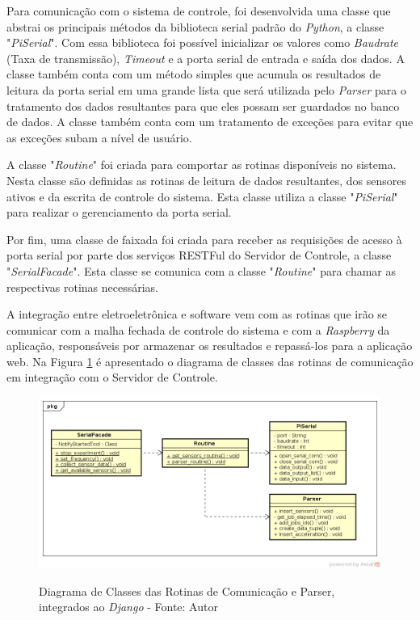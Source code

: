Para comunicação com o sistema de controle, foi desenvolvida uma classe que abstrai os principais métodos da 
biblioteca serial padrão do \textit{Python}, a classe "\textit{PiSerial}".
Com essa biblioteca foi possível inicializar os valores como \textit{Baudrate} (Taxa de transmissão),
\textit{Timeout} e a porta serial de entrada e saída dos dados. A classe também conta com um método simples
que acumula os resultados de leitura da porta serial em uma grande lista que será utilizada pelo \textit{Parser}
para o tratamento dos dados resultantes para que eles possam ser guardados no banco de 
dados. A classe também conta com um tratamento de exceções para evitar que as exceções subam a nível de usuário.

A classe "\textit{Routine}" foi criada para comportar as rotinas disponíveis no sistema.
Nesta classe são definidas as rotinas de leitura de dados resultantes, dos sensores ativos e da escrita de controle do sistema.
Esta classe utiliza a classe  "\textit{PiSerial}" para realizar o gerenciamento da porta serial.

Por fim, uma classe de faixada foi criada para receber as requisições de acesso à porta serial por parte dos serviços RESTFul
do Servidor de Controle, a classe "\textit{SerialFacade}". Esta classe se comunica com a classe "\textit{Routine}" para chamar as 
respectivas rotinas necessárias.

A integração entre eletroeletrônica e software vem com as rotinas que irão se comunicar com a malha fechada de controle do sistema e com a 
\textit{Raspberry} da aplicação, responsáveis por armazenar os resultados e repassá-los para a aplicação web.
Na Figura \ref{fig:uml_routines_parser} é apresentado o diagrama de classes das rotinas de comunicação em integração
com o Servidor de Controle.

\begin{figure}[H]
\centering
\includegraphics[keepaspectratio=true,scale=0.65]{figuras/diagrama_classe_rotinas.png}
\label{fig:uml_routines_parser}
\caption{Diagrama de Classes das Rotinas de Comunicação e Parser, integrados ao \textit{Django} - Fonte: Autor}
\end{figure}


